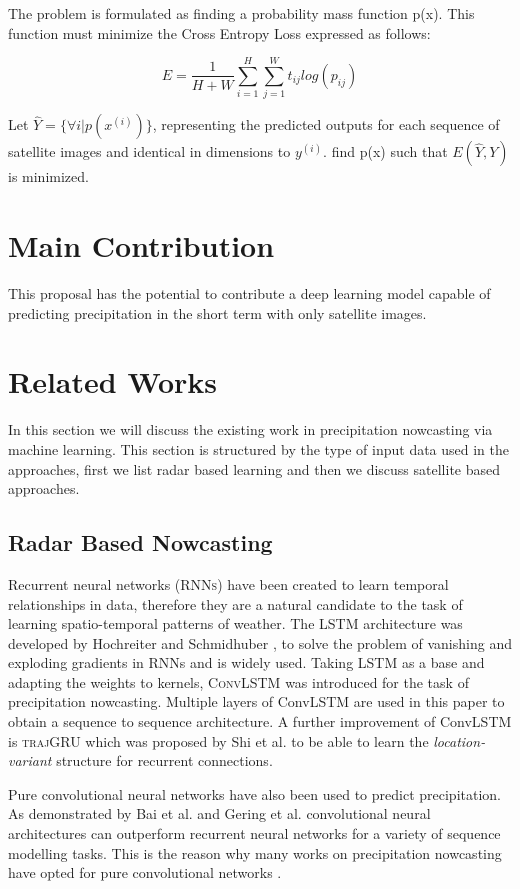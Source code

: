 \documentclass[acmtog, authorversion]{acmart}
\begin{document}
The problem is formulated as finding a probability mass function p(x). This function must minimize the Cross Entropy Loss expressed as follows:

$$E = \frac{1}{H+W}\sum_{i=1}^H\sum_{j=1}^W t_{ij} log(p_{ij})$$

Let $\hat{Y} = \{\forall i | p(x^{(i)})\}$, representing the predicted outputs for each sequence of satellite images and identical in dimensions to $y^{(i)}$.
find p(x) such that $E(\hat{Y}, Y)$ is minimized.




\section{Main Contribution}
This proposal has the potential to contribute a deep learning model capable of predicting precipitation in the short term with only satellite images.

\section{Related Works}

In this section we will discuss the existing work in precipitation nowcasting via machine learning. This section is structured by the type of input data used in the approaches, first we list radar based learning and then we discuss satellite based approaches.

\subsection{Radar Based Nowcasting}

Recurrent neural networks (\textsc{RNNs}) have been created to learn temporal relationships in data, therefore they are a natural candidate to the task of learning spatio-temporal patterns of weather. The \textsc{LSTM} architecture was developed by Hochreiter and Schmidhuber \cite{lstm}, to solve the problem of vanishing and exploding gradients in RNNs and is widely used. Taking LSTM as a base and adapting the weights to kernels, \textsc{ConvLSTM} \cite{convlstm} was introduced for the task of precipitation nowcasting. Multiple layers of ConvLSTM are used in this paper to obtain a sequence to sequence architecture. A further improvement of ConvLSTM is \textsc{trajGRU} which was proposed by Shi et al. \cite{shi2017deep} to be able to learn the \textit{location-variant} structure for recurrent connections.
\medskip

Pure convolutional neural networks have also been used to predict precipitation. As demonstrated by Bai et al. and Gering et al. \cite{bai2018empirical, gehring2017convolutional} convolutional neural architectures can outperform recurrent neural networks for a variety of sequence modelling tasks. This is the reason why many works on precipitation nowcasting have opted for pure convolutional networks \cite{rainet,agrawal2019machine}.
\medskip
\end{document}
